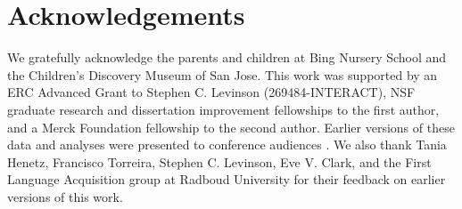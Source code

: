 \documentclass[authoryear, 12pt]{elsarticle}
\begin{document}
\section*{Acknowledgements}

We gratefully acknowledge the parents and children at Bing Nursery School and the Children's Discovery Museum of San Jose. This work was supported by an ERC Advanced Grant to Stephen C. Levinson (269484-INTERACT), NSF graduate research and dissertation improvement fellowships to the first author, and a Merck Foundation fellowship to the second author. Earlier versions of these data and analyses were presented to conference audiences \citep{casillas2012, casillas2013}. We also thank Tania Henetz, Francisco Torreira, Stephen C. Levinson, Eve V. Clark, and the First Language Acquisition group at Radboud University for their feedback on earlier versions of this work.




\end{document}
